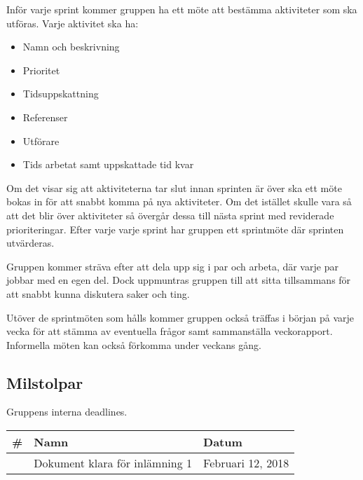 Inför varje sprint kommer gruppen ha ett möte att bestämma aktiviteter som ska utföras. Varje aktivitet ska ha: \begin{itemize}
    \item Namn och beskrivning
    \item Prioritet
    \item Tidsuppskattning
    \item Referenser
    \item Utförare
    \item Tids arbetat samt uppskattade tid kvar
\end{itemize}
Om det visar sig att aktiviteterna tar slut innan sprinten är över ska ett möte bokas in för att snabbt komma på nya aktiviteter. Om det istället skulle vara så att det blir över aktiviteter så övergår dessa till nästa sprint med reviderade prioriteringar. Efter varje varje sprint har gruppen ett sprintmöte där sprinten utvärderas.

Gruppen kommer sträva efter att dela upp sig i par och arbeta, där varje par jobbar med en egen del. Dock uppmuntras gruppen till att sitta tillsammans för att snabbt kunna diskutera saker och ting.

Utöver de sprintmöten som hålls kommer gruppen också träffas i början på varje vecka för att stämma av eventuella frågor samt sammanställa veckorapport. Informella möten kan också förkomma under veckans gång.


\subsection{Milstolpar}
Gruppens interna deadlines.

\begin{center}
    \begin{tabular}{| l | l | l | }
        \hline
        \textbf{\#} & \textbf{Namn} & \textbf{Datum} \\
        \hline
        \centering 1 & Dokument klara för inlämning 1 & Februari 12, 2018\\
        \hline
    \end{tabular}
\end{center}

